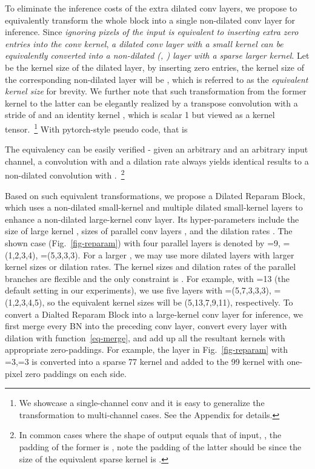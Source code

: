 \documentclass[10pt,twocolumn,letterpaper]{article}
\begin{document}
To eliminate the inference costs of the extra dilated conv layers, we propose to equivalently transform the whole block into a single non-dilated conv layer for inference. Since \emph{ignoring pixels of the input is equivalent to inserting extra zero entries into the conv kernel}, \emph{a dilated conv layer with a small kernel can be equivalently converted into a non-dilated (\ie, ) layer with a sparse larger kernel}. Let  be the kernel size of the dilated layer, by inserting zero entries, the kernel size of the corresponding non-dilated layer will be , which is referred to as the \emph{equivalent kernel size} for brevity. We further note that such transformation from the former kernel  to the latter  can be elegantly realized by a transpose convolution with a stride of  and an identity kernel , which is scalar 1 but viewed as a kernel tensor.~\footnote{We showcase a single-channel conv and it is easy to generalize the transformation to multi-channel cases. See the Appendix for details.} With pytorch-style pseudo code, that is

The equivalency can be easily verified - given an arbitrary  and an arbitrary input channel, a convolution with  and a dilation rate  always yields identical results to a non-dilated convolution with .~\footnote{In common cases where the shape of output equals that of input, \ie, the padding of the former is , note the padding of the latter should be  since the size of the equivalent sparse kernel is .}

Based on such equivalent transformations, we propose a Dilated Reparam Block, which uses a non-dilated small-kernel and multiple dilated small-kernel layers to enhance a non-dilated large-kernel conv layer. Its hyper-parameters include the size of large kernel , sizes of parallel conv layers , and the dilation rates . The shown case (Fig.~\ref{fig-reparam}) with four parallel layers is denoted by =9, =(1,2,3,4), =(5,3,3,3). For a larger , we may use more dilated layers with larger kernel sizes or dilation rates. The kernel sizes and dilation rates of the parallel branches are flexible and the only constraint is . For example, with =13 (the default setting in our experiments), we use five layers with =(5,7,3,3,3), =(1,2,3,4,5), so the equivalent kernel sizes will be (5,13,7,9,11), respectively. To convert a Dialted Reparam Block into a large-kernel conv layer for inference, we first merge every BN into the preceding conv layer, convert every layer with dilation  with function~\ref{eq-merge}, and add up all the resultant kernels with appropriate zero-paddings. For example, the layer in Fig.~\ref{fig-reparam} with =3,=3 is converted into a sparse 77 kernel and added to the 99 kernel with one-pixel zero paddings on each side. 
\end{document}

